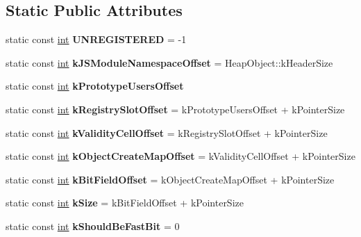 \subsection*{Static Public Attributes}
\begin{DoxyCompactItemize}
\item 
\mbox{\label{classv8_1_1internal_1_1PrototypeInfo_a98d62de8e98c5cd39b161902bb947d14}} 
static const \mbox{\hyperlink{classint}{int}} {\bfseries U\+N\+R\+E\+G\+I\+S\+T\+E\+R\+ED} = -\/1
\item 
\mbox{\label{classv8_1_1internal_1_1PrototypeInfo_a69357b2292912f26af1a079df7930255}} 
static const \mbox{\hyperlink{classint}{int}} {\bfseries k\+J\+S\+Module\+Namespace\+Offset} = Heap\+Object\+::k\+Header\+Size
\item 
static const \mbox{\hyperlink{classint}{int}} {\bfseries k\+Prototype\+Users\+Offset}
\item 
\mbox{\label{classv8_1_1internal_1_1PrototypeInfo_a3b906319993652cb23451f58a58ddcd1}} 
static const \mbox{\hyperlink{classint}{int}} {\bfseries k\+Registry\+Slot\+Offset} = k\+Prototype\+Users\+Offset + k\+Pointer\+Size
\item 
\mbox{\label{classv8_1_1internal_1_1PrototypeInfo_acd8f9aeb2ef2c796f0a7898bb44553ea}} 
static const \mbox{\hyperlink{classint}{int}} {\bfseries k\+Validity\+Cell\+Offset} = k\+Registry\+Slot\+Offset + k\+Pointer\+Size
\item 
\mbox{\label{classv8_1_1internal_1_1PrototypeInfo_ac0e76b1a60ce1dfb769ecf09292c8d5a}} 
static const \mbox{\hyperlink{classint}{int}} {\bfseries k\+Object\+Create\+Map\+Offset} = k\+Validity\+Cell\+Offset + k\+Pointer\+Size
\item 
\mbox{\label{classv8_1_1internal_1_1PrototypeInfo_a70c01e322134ed106d1b9be1748c6b44}} 
static const \mbox{\hyperlink{classint}{int}} {\bfseries k\+Bit\+Field\+Offset} = k\+Object\+Create\+Map\+Offset + k\+Pointer\+Size
\item 
\mbox{\label{classv8_1_1internal_1_1PrototypeInfo_a84ca9d4eaced6fda3553bdfbd0b3f79e}} 
static const \mbox{\hyperlink{classint}{int}} {\bfseries k\+Size} = k\+Bit\+Field\+Offset + k\+Pointer\+Size
\item 
\mbox{\label{classv8_1_1internal_1_1PrototypeInfo_a6b45e6e0375b8da18fe0dc92af70e645}} 
static const \mbox{\hyperlink{classint}{int}} {\bfseries k\+Should\+Be\+Fast\+Bit} = 0
\end{DoxyCompactItemize}
